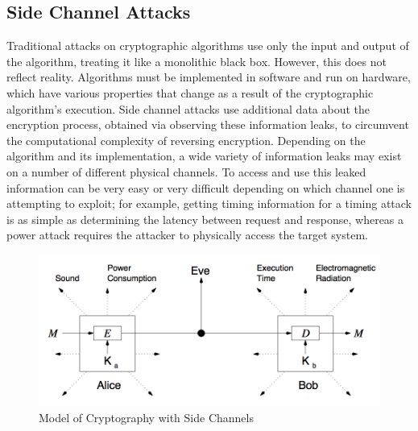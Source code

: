 \documentclass[times, 10pt,twocolumn]{article}
\begin{document}
\subsection{Side Channel Attacks}
Traditional attacks on cryptographic algorithms use only the input and output of the algorithm, treating it like a monolithic black box.  However, this does not reflect reality.  Algorithms must be implemented in software and run on hardware, which have various properties that change as a result of the cryptographic algorithm's execution.  Side channel attacks use additional data about the encryption process, obtained via observing these information leaks, to circumvent the computational complexity of reversing encryption.  Depending on the algorithm and its implementation, a wide variety of information leaks may exist on a number of different physical channels.  To access and use this leaked information can be very easy or very difficult depending on which channel one is attempting to exploit; for example, getting timing information for a timing attack is as simple as determining the latency between request and response, whereas a power attack requires the attacker to physically access the target system.
\begin{figure}[ht]
  \centering
  \includegraphics[scale=.25]{./images/side_channel_model.png}
  \caption{Model of Cryptography with Side Channels}
  \label{fig:top_arch}
\end{figure}
\end{document}
